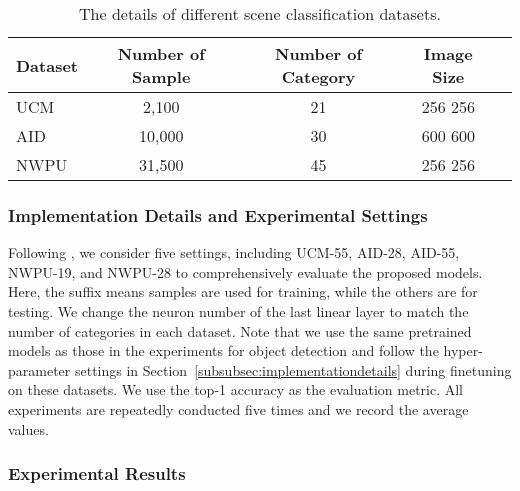 \documentclass[10pt, journal,twoside]{IEEEtran}
\begin{document}
\begin{table}[t]
  \scriptsize
  \caption{The details of different scene classification datasets.}
  \newcommand{\tabincell}[2]{\begin{tabular}{@{}#1@{}}#2\end{tabular}}
  \centering
  \begin{tabular}{l|cccc}
  \hline
  Dataset  & Number of Sample & Number of Category & Image Size \\
  \hline
  UCM & 2,100 & 21 & 256  256 \\
  AID  & 10,000 & 30 & 600  600\\
  NWPU  & 31,500 & 45 & 256  256 \\
  \hline
\end{tabular}
  \label{cls_datasets}
\end{table}

\subsubsection{Implementation Details and Experimental Settings}
Following \cite{mblanet_2021_asr}, we consider five settings, including UCM-55, AID-28, AID-55, NWPU-19, and NWPU-28 to comprehensively evaluate the proposed models. Here, the suffix  means  samples are used for training, while the others are for testing. We change the neuron number of the last linear layer to match the number of categories in each dataset. Note that we use the same pretrained models as those in the experiments for object detection and follow the hyper-parameter settings in Section~\ref{subsubsec:implementationdetails} during finetuning on these datasets. We use the top-1 accuracy as the evaluation metric. All experiments are repeatedly conducted five times and we record the average values.

\subsubsection{Experimental Results}
\end{document}
